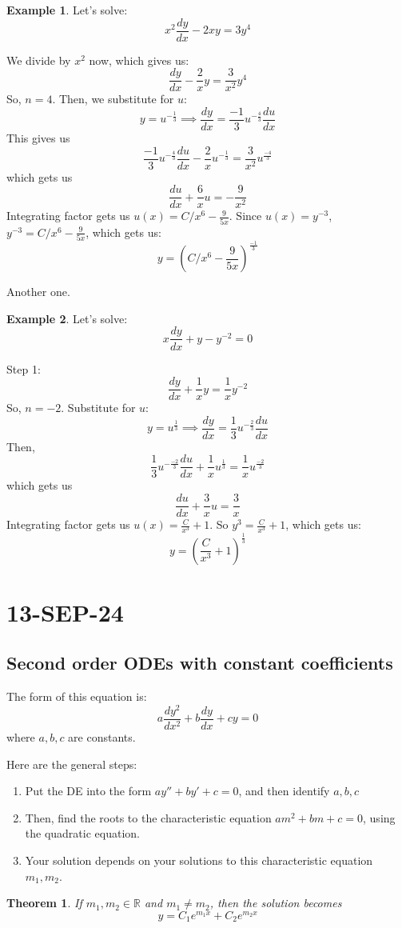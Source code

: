 \documentclass[10pt, oneside]{article}
\newtheorem{thm}{Theorem}
\theoremstyle{definition}
\newtheorem{example}{Example}[section]
\begin{document}
\begin{example}
    Let's solve:
    \[ 
    x^2\frac{dy}{dx} - 2xy = 3y^4
    \]

    We divide by $x^2$ now, which gives us:
    \[
    \frac{dy}{dx} - \frac{2}{x}y = \frac{3}{x^2}y^4
    \]
    So, $n=4$. Then, we substitute for $u$:
    \[ 
    y = u^{-\frac{1}{3}} \implies \frac{dy}{dx} = \frac{-1}{3}u^{-\frac{4}{3}}\frac{du}{dx}
    \]
    This gives us
    \[
    \frac{-1}{3}u^{-\frac{4}{3}}\frac{du}{dx} - \frac{2}{x}u^{-\frac{1}{3}} = \frac{3}{x^2}u^\frac{-4}{3}
    \]
    which gets us
    \[\frac{du}{dx} + \frac{6}{x}u = -\frac{9}{x^2} \]
    Integrating factor gets us $u(x) = C/x^6 - \frac{9}{5x}$. Since $u(x) = y^{-3}$, $y^{-3} = C/x^6 - \frac{9}{5x}$, which gets us:
    \[ 
    y = (C/x^6 - \frac{9}{5x})^{\frac{-1}{3}}
    \]
\end{example}
Another one.

\begin{example}
    Let's solve:
    \[ 
    x\frac{dy}{dx} + y - y^{-2} = 0
    \]

    Step 1:
    \[
    \frac{dy}{dx} + \frac{1}{x}y = \frac{1}{x}y^{-2}
    \]
    So, $n=-2$. Substitute for $u$:
    \[ 
    y = u^{\frac{1}{3}} \implies \frac{dy}{dx} = \frac{1}{3}u^{-\frac{2}{3}}\frac{du}{dx}
    \]
    Then, 
    \[
    \frac{1}{3}u^{-\frac{-2}{3}}\frac{du}{dx} + \frac{1}{x}u^{\frac{1}{3}} = \frac{1}{x}u^{\frac{-2}{3}}
    \]
    which gets us
    \[\frac{du}{dx} + \frac{3}{x}u = \frac{3}{x} \]
    Integrating factor gets us $u(x) = \frac{C}{x^3} + 1$. So $y^{3} = \frac{C}{x^3} + 1$, which gets us:
    \[ 
    y = (\frac{C}{x^3} + 1)^\frac{1}{3}
    \]
\end{example}

\section{13-SEP-24}
\subsection{Second order ODEs with constant coefficients}
The form of this equation is:
\[
a \frac{dy^2}{dx^2} + b \frac{dy}{dx} + cy = 0
\] 
where $a, b, c$ are constants.

Here are the general steps:
\begin{enumerate}
    \item Put the DE into the form $ay'' + by' + c = 0$, and then identify $a, b, c$
    \item Then, find the roots to the characteristic equation $am^2 + bm + c = 0$, using the quadratic equation. 
    \item Your solution depends on your solutions to this characteristic equation $m_1, m_2$.
\end{enumerate}
\begin{thm} \label{real distinct}
If $m_1, m_2 \in \mathbb{R}$ and $m_1 \neq m_2$, then the solution becomes 
\[ 
y = C_1e^{m_1x}+C_2e^{m_2x}
\]
\end{thm}
\end{document}
